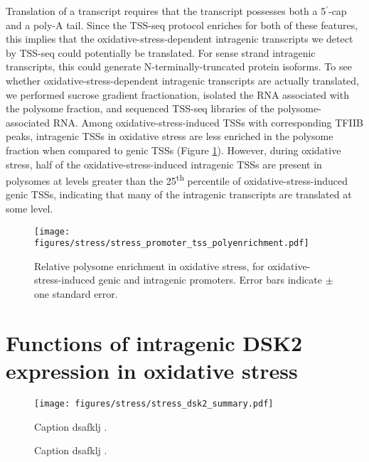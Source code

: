 Translation of a transcript requires that the transcript possesses both a 5$^\prime$-cap and a poly-A tail.
Since the TSS-seq protocol enriches for both of these features, this implies that the oxidative-stress-dependent intragenic transcripts we detect by TSS-seq could potentially be translated.
For sense strand intragenic transcripts, this could generate N-terminally-truncated protein isoforms.
To see whether oxidative-stress-dependent intragenic transcripts are actually translated, we performed sucrose gradient fractionation, isolated the RNA associated with the polysome fraction, and sequenced TSS-seq libraries of the polysome-associated RNA.
Among oxidative-stress-induced TSSs with corresponding TFIIB peaks, intragenic TSSs in oxidative stress are less enriched in the polysome fraction when compared to genic TSSs (Figure \ref{fig:stress_promoter_tss_polyenrichment}).
However, during oxidative stress, half of the oxidative-stress-induced intragenic TSSs are present in polysomes at levels greater than the 25\textsuperscript{th} percentile of oxidative-stress-induced genic TSSs, indicating that many of the intragenic transcripts are translated at some level.

\begin{figure}[h]
    \texttt{[image: figures/stress/stress\_promoter\_tss\_polyenrichment.pdf]}
    \caption[Relative polysome enrichment in oxidative stress, for oxidative-stress-induced genic and intragenic promoters.]{Relative polysome enrichment in oxidative stress, for oxidative-stress-induced genic and intragenic promoters. Error bars indicate $\pm$ one standard error.}
    \label{fig:stress_promoter_tss_polyenrichment}
\end{figure}

\section{Functions of intragenic DSK2 expression in oxidative stress}

\lipsum[1]

\begin{figure}[h]
    \texttt{[image: figures/stress/stress\_dsk2\_summary.pdf]}
    \caption[A figure showing TSS-seq, TFIIB ChIP-nexus, and MNase-ChIP-seq at DSK2.]{Caption dsafklj .}
    \label{fig:stress_dsk2_summary}
\end{figure}

\begin{figure}
\caption[A figure showing DSK2 fitness competition results.]{Caption dsafklj .}
\end{figure}


